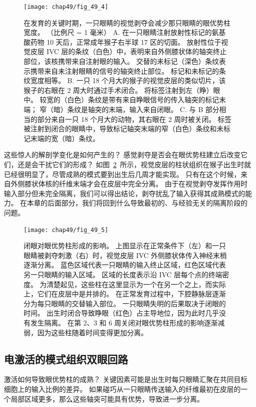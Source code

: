 \begin{figure}[htbp]
	\centering
	\texttt{[image: chap49/fig\_49\_4]}
	\caption{在发育的关键时期，一只眼睛的视觉剥夺会减少那只眼睛的眼优势柱宽度。
		（比例尺 = 1 毫米）\cite{hubel1977ferrier}
		A. 在一只眼睛注射放射性标记的氨基酸药物 10 天后，正常成年猴子右半球 17 区的切面。
		放射性位于视觉皮层 IVC 层的条纹（白色）中，表明来自外侧膝状体的轴突终止部位，该核携带来自注射眼的输入。
		交替的未标记（深色）条纹表示携带来自未注射眼睛的信号的轴突终止部位。
		标记和未标记的条纹宽度相等。
		B. 一只 18 个月大的猴子的视觉皮层的类似切片，该猴子的右眼在 2 周大时通过手术闭合。
		将标签注射到左（睁）眼中。
		较宽的（白色）条纹是带有来自睁眼信号的传入轴突的标记末端； 窄（暗）条纹是轴突的末端，输入来自闭眼。
		C. 与 B 部分相当的部分来自一只 18 个月大的动物，其右眼在 2 周时被关闭。
		标签被注射到闭合的眼睛中，导致标记轴突末端的窄（白色）条纹和未标记末端的宽（暗）条纹。}
	\label{fig:49_4}
\end{figure}


这些惊人的解剖学变化是如何产生的？
感觉剥夺是否会在眼优势柱建立后改变它们，还是会干扰它们的形成？
如图~\ref{fig:49_5}~所示，视觉皮层的柱状组织在猴子出生时就已经很明显了，尽管成熟的模式要到出生后几周才能实现。
只有在这个时候，来自外侧膝状体核的纤维末端才会在皮层中完全分离。
由于在视觉剥夺发挥作用时输入部分但未完全隔离，我们可以得出结论，剥夺扰乱了输入获得其成熟模式的能力。
在本章的后面部分，我们将回到什么导致最初的、与经验无关的隔离阶段的问题。


\begin{figure}[htbp]
	\centering
	\texttt{[image: chap49/fig\_49\_5]}
	\caption{闭眼对眼优势柱形成的影响。
		上图显示在正常条件下（左）和一只眼睛被剥夺刺激（右）时，视觉皮层 IVC 外侧膝状体传入神经末梢逐渐分离。
		蓝色区域代表一只眼睛的输入终止区域，红色区域代表另一只眼睛的输入区域。
		区域的长度表示沿 IVC 层每个点的终端密度。
		为清楚起见，这些柱在这里显示为一个在另一个之上，而实际上，它们在皮层中是并排的。
		在正常发育过程中，下腔静脉层逐渐分为每只眼睛的交替输入部位。
		一只眼睛失明的后果取决于闭眼的时间。
		出生时闭合导致睁眼（红色）占主导地位，因为此时几乎没有发生隔离。
		在第 2、3 和 6 周关闭对眼优势柱形成的影响逐渐减弱，因为这些柱随着时间变得更加分离\cite{hubel1977ferrier}。 }
	\label{fig:49_5}
\end{figure}


\subsection{电激活的模式组织双眼回路}

激活如何导致眼优势柱的成熟？
关键因素可能是出生时每只眼睛汇聚在共同目标细胞上的输入比例的差异。
如果碰巧从一只眼睛传送输入的纤维最初在皮层的一个局部区域更多，那么这些轴突可能具有优势，导致进一步分离。


